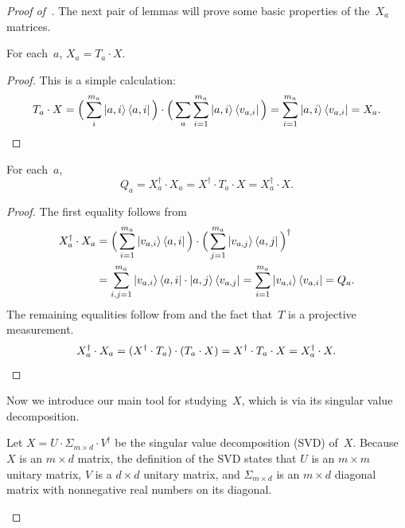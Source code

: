 \begin{proof}[Proof of~]
The next pair of lemmas will prove some basic properties of the~$X_a$ matrices.

\begin{lemma}\label{lem:xa-t}
For each~$a$, $\displaystyle
X_a = T_a \cdot X.
$
\end{lemma}
\begin{proof}
This is a simple calculation:
\begin{equation*}
T_a \cdot X = \Big(\sum_i^{m_a} \ket{a, i} \bra{a,i}\Big)\cdot \Big( \sum_a \sum_{i=1}^{m_a}  \ket{a, i}\bra{v_{a, i}}\Big) 
= \sum_{i=1}^{m_a} \ket{a, i}\bra{v_{a, i}} = X_a.\qedhere
\end{equation*}
\end{proof}

\begin{lemma}[$Q_a$ restated]\label{lem:qa-restated}
For each~$a$,
\begin{equation*}
Q_a = X^\dagger_a \cdot X_a = X^\dagger \cdot T_a \cdot X = X_a^\dagger \cdot X.
\end{equation*}
\end{lemma}
\begin{proof}
The first equality follows from
\begin{align*}
X_a^\dagger \cdot X_a
&= \Big(\sum_{i=1}^{m_a} \ket{v_{a, i}}\bra{a, i} \Big) \cdot \Big(\sum_{j=1}^{m_a} \ket{v_{a, j}}\bra{a, j} \Big)^\dagger\nonumber\\
&= \sum_{i, j=1}^{m_a} \ket{v_{a, i}}\bra{a, i} \cdot \ket{a, j} \bra{v_{a, j}}
= \sum_{i=1}^{m_a} \ket{v_{a,i}}\bra{v_{a,i}} = Q_a.
\end{align*}
The remaining equalities follow from  and the fact that~$T$ is a projective measurement.
\begin{equation*}
X_a^\dagger \cdot X_a
= (X^\dagger \cdot T_a) \cdot (T_a  \cdot X)
= X^\dagger \cdot T_a \cdot X = X_a^\dagger \cdot X.\qedhere
\end{equation*}
\end{proof}

Now we introduce our main tool for studying~$X$, which is via its singular value decomposition.

\begin{definition}[SVD of~$X$]
Let $X = U \cdot \Sigma_{m \times d} \cdot V^\dagger$ be the singular value decomposition (SVD) of~$X$.
Because~$X$ is an $m \times d$ matrix,
the definition of the SVD states that
$U$ is an $m \times m$ unitary matrix,
$V$ is a $d \times d$ unitary matrix,
and $\Sigma_{m\times d}$ is an $m \times d$ diagonal matrix
with nonnegative real numbers on its diagonal.
\end{definition}


\end{proof}
